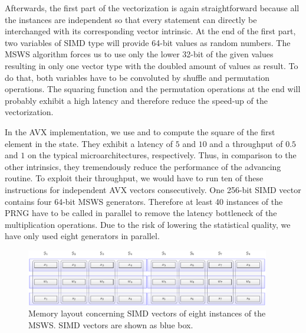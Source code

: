 \documentclass{stdlocal}
\begin{document}
    Afterwards, the first part of the vectorization is again straightforward because all the instances are independent so that every statement can directly be interchanged with its corresponding vector intrinsic.
    At the end of the first part, two variables of SIMD type will provide 64-bit values as random numbers.
    The MSWS algorithm forces us to use only the lower 32-bit of the given values resulting in only one vector type with the doubled amount of values as result.
    To do that, both variables have to be convoluted by shuffle and permutation operations.
    The squaring function and the permutation operations at the end will probably exhibit a high latency and therefore reduce the speed-up of the vectorization.


    In the AVX implementation, we use  and  to compute the square of the first element in the state.
    They exhibit a latency of $5$ and $10$ and a throughput of $0.5$ and $1$ on the typical microarchitectures, respectively.
    Thus, in comparison to the other intrinsics, they tremendously reduce the performance of the advancing routine.
    To exploit their throughput, we would have to run ten of these instructions for independent AVX vectors consecutively.
    One 256-bit SIMD vector contains four 64-bit MSWS generators.
    Therefore at least 40 instances of the PRNG have to be called in parallel to remove the latency bottleneck of the multiplication operations.
    Due to the risk of lowering the statistical quality, we have only used eight generators in parallel.

    \begin{figure}
      \center
      \includegraphics[width=0.95\textwidth]{figures/msws_vector_layout.pdf}
      \caption[MSWS Vector Layout]{%
        Memory layout concerning SIMD vectors of eight instances of the MSWS.
        SIMD vectors are shown as blue box.
      }
      \label{fig:msws-vector-layout}
    \end{figure}
\end{document}
